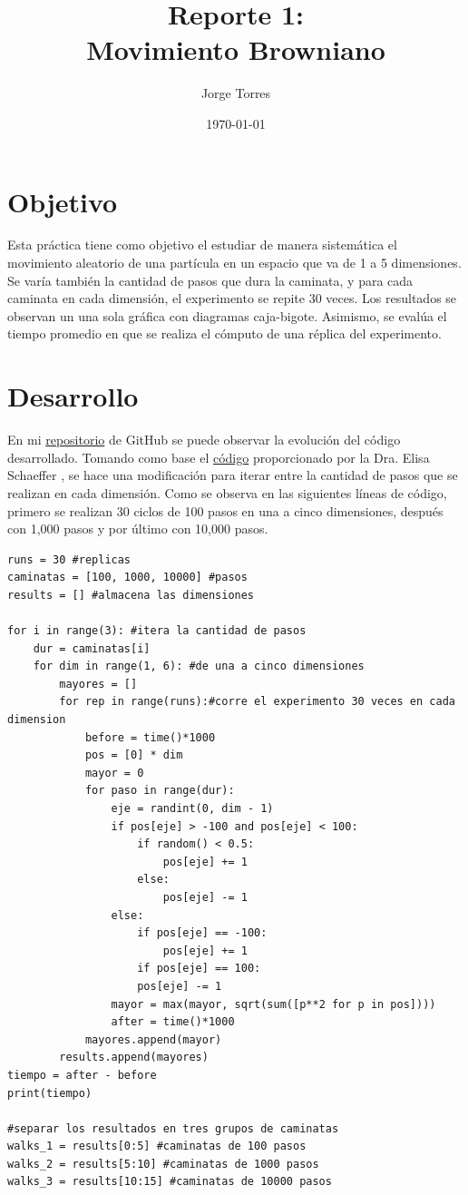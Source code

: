 \documentclass{article}
\title{Reporte 1:\\Movimiento Browniano}
\author{Jorge Torres}
\date{\today}
\begin{document}
\maketitle

\section{Objetivo}
Esta pr\'actica tiene como objetivo el estudiar de manera sistem\'atica el movimiento aleatorio de una part\'icula en un espacio que va de 1 a 5 dimensiones. Se var\'ia tambi\'en la cantidad de pasos que dura la caminata, y para cada caminata en cada dimensi\'on, el experimento se repite 30 veces. Los resultados se observan un una sola gr\'afica con diagramas caja-bigote. Asimismo, se eval\'ua el tiempo promedio en que se realiza el c\'omputo de una r\'eplica del experimento.

\section{Desarrollo}
En mi \href{https://github.com/FeroxDeitas/Simulacion-Nano/tree/main/Tareas/P1}{repositorio} de GitHub se puede observar la evoluci\'on del c\'odigo desarrollado. Tomando como base el \href{https://github.com/satuelisa/Simulation/blob/master/BrownianMotion/sinpar.py}{c\'odigo} proporcionado por la Dra. Elisa Schaeffer \cite{elisa1}, se hace una modificaci\'on para iterar entre la cantidad de pasos que se realizan en cada dimensi\'on. Como se observa en las siguientes l\'ineas de c\'odigo, primero se realizan 30 ciclos de 100 pasos en una a cinco dimensiones, despu\'es con 1,000 pasos y por \'ultimo con 10,000 pasos.

\begin{lstlisting}
runs = 30 #replicas
caminatas = [100, 1000, 10000] #pasos
results = [] #almacena las dimensiones

for i in range(3): #itera la cantidad de pasos
    dur = caminatas[i]
    for dim in range(1, 6): #de una a cinco dimensiones
        mayores = []
        for rep in range(runs):#corre el experimento 30 veces en cada dimension
            before = time()*1000
            pos = [0] * dim
            mayor = 0
            for paso in range(dur):
                eje = randint(0, dim - 1)
                if pos[eje] > -100 and pos[eje] < 100:
                    if random() < 0.5:
                        pos[eje] += 1
                    else:
                        pos[eje] -= 1
                else:
                    if pos[eje] == -100:
                        pos[eje] += 1
                    if pos[eje] == 100:
                    pos[eje] -= 1
                mayor = max(mayor, sqrt(sum([p**2 for p in pos])))
                after = time()*1000
            mayores.append(mayor)
        results.append(mayores)
tiempo = after - before
print(tiempo)

#separar los resultados en tres grupos de caminatas
walks_1 = results[0:5] #caminatas de 100 pasos
walks_2 = results[5:10] #caminatas de 1000 pasos
walks_3 = results[10:15] #caminatas de 10000 pasos
\end{lstlisting}
\end{document}
